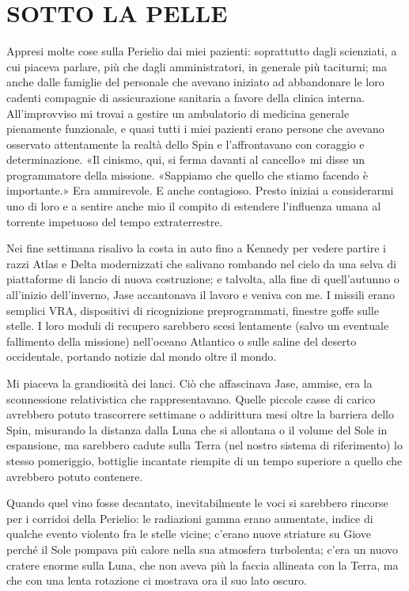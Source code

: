 \chapter{SOTTO LA PELLE}\label{sotto-la-pelle}

\hfill\break

Appresi molte cose sulla Perielio dai miei pazienti: soprattutto dagli
scienziati, a cui piaceva parlare, più che dagli amministratori, in
generale più taciturni; ma anche dalle famiglie del personale che
avevano iniziato ad abbandonare le loro cadenti compagnie di
assicurazione sanitaria a favore della clinica interna. All'improvviso
mi trovai a gestire un ambulatorio di medicina generale pienamente
funzionale, e quasi tutti i miei pazienti erano persone che avevano
osservato attentamente la realtà dello Spin e l'affrontavano con
coraggio e determinazione. «Il cinismo, qui, si ferma davanti al
cancello» mi disse un programmatore della missione. «Sappiamo che quello
che stiamo facendo è importante.» Era ammirevole. E anche contagioso.
Presto iniziai a considerarmi uno di loro e a sentire anche mio il
compito di estendere l'influenza umana al torrente impetuoso del tempo
extraterrestre.

Nei fine settimana risalivo la costa in auto fino a Kennedy per vedere
partire i razzi Atlas e Delta modernizzati che salivano rombando nel
cielo da una selva di piattaforme di lancio di nuova costruzione; e
talvolta, alla fine di quell'autunno o all'inizio dell'inverno, Jase
accantonava il lavoro e veniva con me. I missili erano semplici VRA,
dispositivi di ricognizione preprogrammati, finestre goffe sulle stelle.
I loro moduli di recupero sarebbero scesi lentamente (salvo un eventuale
fallimento della missione) nell'oceano Atlantico o sulle saline del
deserto occidentale, portando notizie dal mondo oltre il mondo.

Mi piaceva la grandiosità dei lanci. Ciò che affascinava Jase, ammise,
era la sconnessione relativistica che rappresentavano. Quelle piccole
casse di carico avrebbero potuto trascorrere settimane o addirittura
mesi oltre la barriera dello Spin, misurando la distanza dalla Luna che
si allontana o il volume del Sole in espansione, ma sarebbero cadute
sulla Terra (nel nostro sistema di riferimento) lo stesso pomeriggio,
bottiglie incantate riempite di un tempo superiore a quello che
avrebbero potuto contenere.

Quando quel vino fosse decantato, inevitabilmente le voci si sarebbero
rincorse per i corridoi della Perielio: le radiazioni gamma erano
aumentate, indice di qualche evento violento fra le stelle vicine;
c'erano nuove striature su Giove perché il Sole pompava più calore nella
sua atmosfera turbolenta; c'era un nuovo cratere enorme sulla Luna, che
non aveva più la faccia allineata con la Terra, ma che con una lenta
rotazione ci mostrava ora il suo lato oscuro.

